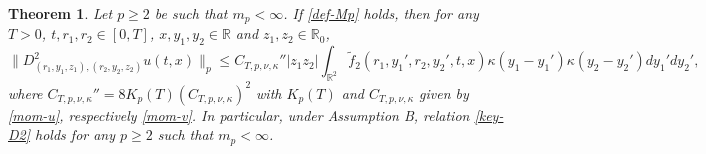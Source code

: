 \documentclass[12pt]{article}
\newtheorem{theorem}{Theorem}[section]
\def\bR{\mathbb{R}}
\def\k{\kappa}
\begin{document}
\begin{theorem}
\label{key-thD2}
Let $p\geq 2$ be such that $m_p<\infty$. If \eqref{def-Mp} holds, then for any $T>0$, $t,r_1,r_2 \in [0,T]$, $x,y_1,y_2 \in \bR$ and $z_1,z_2 \in \bR_0$,
\begin{equation}
\label{key-D2}
\|D_{(r_1,y_1,z_1),(r_2,y_2,z_2)}^2 u(t,x) \|_p \leq C_{T,p,\nu,\k}'' |z_1 z_2| \int_{\bR^2} \widetilde{f}_2(r_1,y_1',r_2,y_2',t,x) \k(y_1-y_1')\k(y_2-y_2') dy_1'dy_2',
\end{equation}
where $C_{T,p,\nu,\k}''= 8K_p(T) (C_{T,p,\nu,\k})^2$ with $K_p(T)$ and $C_{T,p,\nu,\k}$ given by \eqref{mom-u}, respectively \eqref{mom-v}. In particular, under Assumption B, relation \eqref{key-D2} holds for any $p\geq 2$ such that $m_p<\infty$.
\end{theorem}
\end{document}
